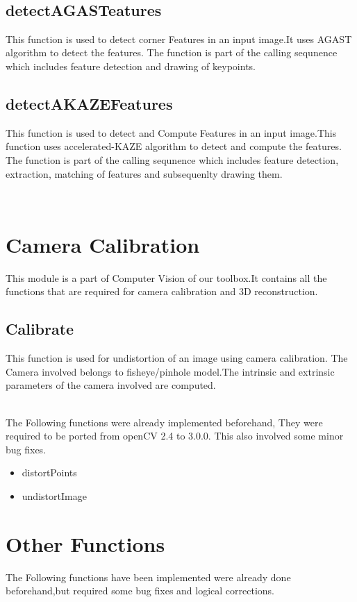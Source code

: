 \documentclass[12pt]{report}
\begin{document}
\\
  \subsection{detectAGASTeatures}
  This function is used to detect corner Features in an input image.It uses AGAST algorithm to detect the features.
  The function is part of the calling sequnence which includes feature detection and drawing of keypoints.

  \subsection{detectAKAZEFeatures}
  This function is used to detect and Compute Features in an input image.This function uses accelerated-KAZE algorithm to detect and compute the features.
  The function is part of the calling sequnence which includes feature detection, extraction, matching of features and  subsequenlty drawing them.
 
 \\
 
 \section{Camera Calibration}
 This module\cite{cc} is a part of Computer Vision of our toolbox.It contains all the functions that are required for camera calibration and 3D reconstruction.

 \subsection{Calibrate}
 This function\cite{clb} is used for undistortion of an image using camera calibration. The Camera involved belongs to fisheye/pinhole model.The intrinsic and 
 extrinsic parameters of the camera  involved are computed.

 \\
 \justify 
 The Following functions were already implemented beforehand, They were required to be ported from openCV 2.4 to 3.0.0. This also involved some minor bug fixes.
 \\
 \begin{itemize}
	\item distortPoints
	\item undistortImage
 \end{itemize}

 \section{Other Functions}
 The Following functions have been implemented were already done beforehand,but required some bug fixes and logical corrections.
 \\
\end{document}
